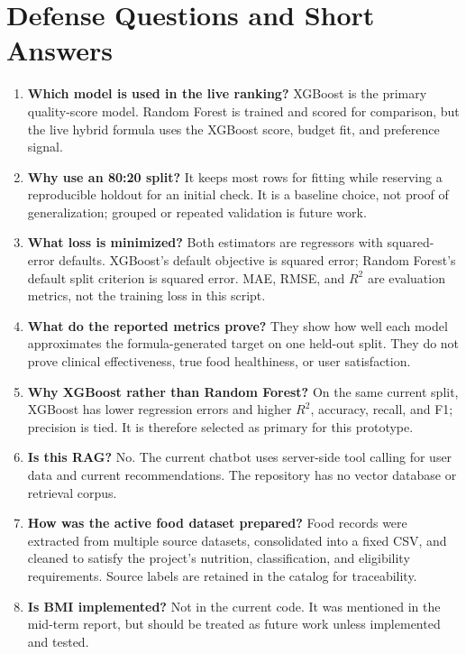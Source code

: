 \documentclass[12pt,a4paper]{report}
\begin{document}
\chapter*{Defense Questions and Short Answers}
\begin{enumerate}
  \item \textbf{Which model is used in the live ranking?} XGBoost is the primary
        quality-score model. Random Forest is trained and scored for comparison, but the
        live hybrid formula uses the XGBoost score, budget fit, and preference signal.
  \item \textbf{Why use an 80:20 split?} It keeps most rows for fitting while reserving a
        reproducible holdout for an initial check. It is a baseline choice, not proof of
        generalization; grouped or repeated validation is future work.
  \item \textbf{What loss is minimized?} Both estimators are regressors with squared-error
        defaults. XGBoost's default objective is squared error; Random Forest's default
        split criterion is squared error. MAE, RMSE, and $R^2$ are evaluation metrics, not
        the training loss in this script.
  \item \textbf{What do the reported metrics prove?} They show how well each model
        approximates the formula-generated target on one held-out split. They do not prove
        clinical effectiveness, true food healthiness, or user satisfaction.
  \item \textbf{Why XGBoost rather than Random Forest?} On the same current split,
        XGBoost has lower regression errors and higher $R^2$, accuracy, recall, and F1;
        precision is tied. It is therefore selected as primary for this prototype.
  \item \textbf{Is this RAG?} No. The current chatbot uses server-side tool calling for
        user data and current recommendations. The repository has no vector database or
        retrieval corpus.
  \item \textbf{How was the active food dataset prepared?} Food records were extracted
        from multiple source datasets, consolidated into a fixed CSV, and cleaned to
        satisfy the project's nutrition, classification, and eligibility requirements.
        Source labels are retained in the catalog for traceability.
  \item \textbf{Is BMI implemented?} Not in the current code. It was mentioned in the
        mid-term report, but should be treated as future work unless implemented and
        tested.
\end{enumerate}
\end{document}
